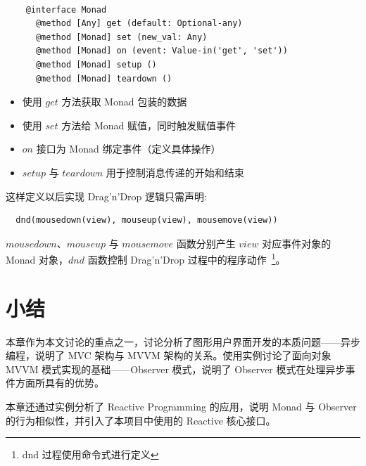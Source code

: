 \begin{verbatim}

    @interface Monad
      @method [Any] get (default: Optional-any)
      @method [Monad] set (new_val: Any)
      @method [Monad] on (event: Value-in('get', 'set'))
      @method [Monad] setup ()
      @method [Monad] teardown ()

\end{verbatim}

\begin{itemize}
  \item 使用 $get$ 方法获取 Monad 包装的数据
  \item 使用 $set$ 方法给 Monad 赋值，同时触发赋值事件
  \item $on$ 接口为 Monad 绑定事件（定义具体操作）
  \item $setup$ 与 $teardown$ 用于控制消息传递的开始和结束
\end{itemize}

这样定义以后实现 Drag'n'Drop 逻辑只需声明:

\begin{verbatim}
  dnd(mousedown(view), mouseup(view), mousemove(view))
\end{verbatim}

$mousedown$、$mouseup$ 与 $mousemove$ 函数分别产生 $view$ 对应事件对象的 Monad 对象，$dnd$ 函数控制 Drag'n'Drop 过程中的程序动作~\footnote{dnd 过程使用命令式进行定义}。

\section{小结}

本章作为本文讨论的重点之一，讨论分析了图形用户界面开发的本质问题——异步编程，说明了 MVC 架构与 MVVM 架构的关系。使用实例讨论了面向对象 MVVM 模式实现的基础——Observer 模式，说明了 Observer 模式在处理异步事件方面所具有的优势。

本章还通过实例分析了 Reactive Programming 的应用，说明 Monad 与 Observer 的行为相似性，并引入了本项目中使用的 Reactive 核心接口。

